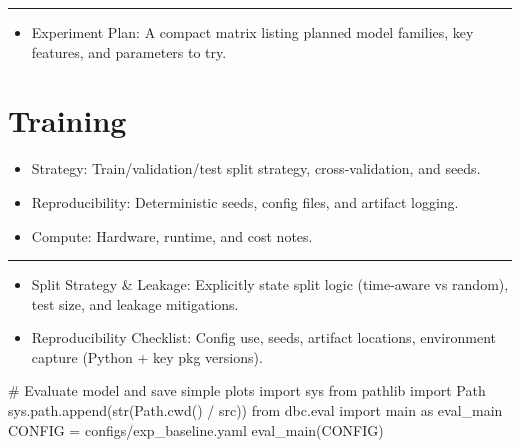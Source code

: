 \documentclass[
  letterpaper,
  DIV=11,
  numbers=noendperiod]{scrartcl}
\newenvironment{Shaded}{\begin{snugshade}}{\end{snugshade}}
\newcommand{\BuiltInTok}[1]{\textcolor[rgb]{0.00,0.23,0.31}{#1}}
\newcommand{\CommentTok}[1]{\textcolor[rgb]{0.37,0.37,0.37}{#1}}
\newcommand{\ImportTok}[1]{\textcolor[rgb]{0.00,0.46,0.62}{#1}}
\newcommand{\NormalTok}[1]{\textcolor[rgb]{0.00,0.23,0.31}{#1}}
\newcommand{\OperatorTok}[1]{\textcolor[rgb]{0.37,0.37,0.37}{#1}}
\newcommand{\StringTok}[1]{\textcolor[rgb]{0.13,0.47,0.30}{#1}}
\providecommand{\tightlist}{%
  \setlength{\itemsep}{0pt}\setlength{\parskip}{0pt}}
\renewenvironment{Shaded}{%
  \begin{tcolorbox}[%
    enhanced,%
    colback=codebg,%
    colframe=codebg,%
    borderline west={3pt}{0pt}{sectionblue},%
    boxrule=0pt,%
    arc=0pt,%
    boxsep=5pt,%
    left=2mm,%
    right=2mm,%
    top=2mm,%
    bottom=2mm%
  ]%
}{%
  \end{tcolorbox}%
}
\begin{document}
\begin{center}\rule{0.5\linewidth}{0.5pt}\end{center}

\begin{itemize}
\tightlist
\item
  Experiment Plan: A compact matrix listing planned model families, key
  features, and parameters to try.
\end{itemize}

\section{Training}\label{training}

\begin{itemize}
\tightlist
\item
  Strategy: Train/validation/test split strategy, cross-validation, and
  seeds.
\item
  Reproducibility: Deterministic seeds, config files, and artifact
  logging.
\item
  Compute: Hardware, runtime, and cost notes.
\end{itemize}

\begin{center}\rule{0.5\linewidth}{0.5pt}\end{center}

\begin{itemize}
\tightlist
\item
  Split Strategy \& Leakage: Explicitly state split logic (time-aware vs
  random), test size, and leakage mitigations.
\item
  Reproducibility Checklist: Config use, seeds, artifact locations,
  environment capture (Python + key pkg versions).
\end{itemize}

\begin{Shaded}
\begin{Highlighting}[]
\CommentTok{\# Evaluate model and save simple plots}
\ImportTok{import}\NormalTok{ sys}
\ImportTok{from}\NormalTok{ pathlib }\ImportTok{import}\NormalTok{ Path}
\NormalTok{sys.path.append(}\BuiltInTok{str}\NormalTok{(Path.cwd() }\OperatorTok{/} \StringTok{\textquotesingle{}src\textquotesingle{}}\NormalTok{))}
\ImportTok{from}\NormalTok{ dbc.}\BuiltInTok{eval} \ImportTok{import}\NormalTok{ main }\ImportTok{as}\NormalTok{ eval\_main}
\NormalTok{CONFIG }\OperatorTok{=} \StringTok{\textquotesingle{}configs/exp\_baseline.yaml\textquotesingle{}}
\NormalTok{eval\_main(CONFIG)}
\end{Highlighting}
\end{Shaded}
\end{document}
